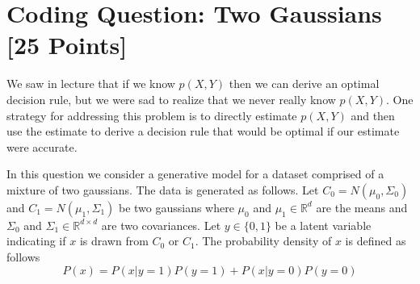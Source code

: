 \documentclass[11pt]{exam}
\newcommand{\R}{\mathbb{R}}
\begin{document}
\section{Coding Question: Two Gaussians [25 Points]}
We saw in lecture that if we know $p(X, Y)$ then we can derive an
optimal decision rule, but we were sad to realize that we never really
know $p(X, Y)$. One strategy for addressing this problem is to
directly estimate $p(X, Y)$ and then use the estimate to derive a
decision rule that would be optimal if our estimate were accurate.

In this question we consider a generative model for a 
dataset comprised of a mixture of two gaussians.  The data is
generated as follows. Let $C_0 = N(\mu_0,\Sigma_0)$ and
$C_1 = N(\mu_1,\Sigma_1)$ be two gaussians where $\mu_0$ and
$\mu_1 \in \R^d$ are the means and $\Sigma_0$ and
$\Sigma_1 \in \R^{d \times d}$ are two covariances.  Let
$y \in \{0,1\}$ be a latent variable indicating if $x$ is drawn from
$C_0$ or $C_1$.  The probability density of $x$ is defined as follows
\begin{equation}
P(x) = P(x|y=1)P(y=1) + P(x|y=0)P(y=0)
\end{equation}
\end{document}
